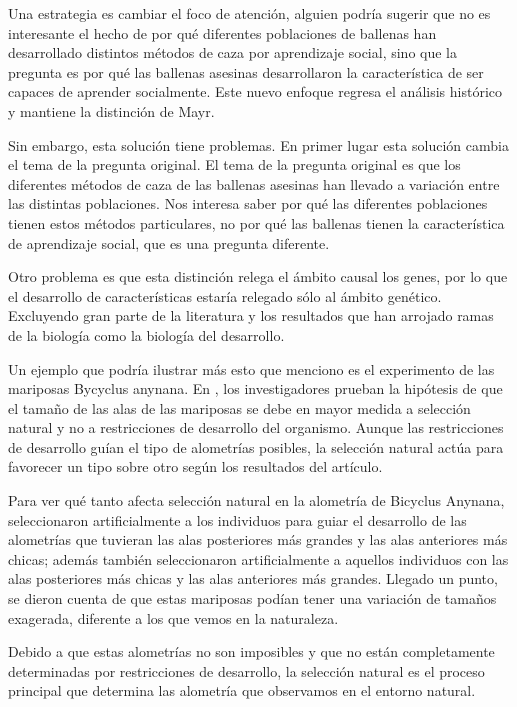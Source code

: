 Una estrategia es cambiar el foco de atención, alguien podría sugerir que no es interesante el hecho de por qué diferentes poblaciones de ballenas han desarrollado distintos métodos de caza por aprendizaje social, sino que la pregunta es por qué las ballenas asesinas desarrollaron la característica de ser capaces de aprender socialmente. Este nuevo enfoque regresa el análisis histórico y mantiene la distinción de Mayr.

Sin embargo, esta solución tiene problemas. En primer lugar esta solución cambia el tema de la pregunta original. El tema de la pregunta original es que los diferentes métodos de caza de las ballenas asesinas han llevado a variación entre las distintas poblaciones. Nos interesa saber por qué las diferentes poblaciones tienen estos métodos particulares, no por qué las ballenas tienen la característica de aprendizaje social, que es una pregunta diferente.

Otro problema es que esta distinción relega el ámbito causal los genes, por lo que el desarrollo de características estaría relegado sólo al ámbito genético. Excluyendo gran parte de la literatura y los resultados que han arrojado ramas de la biología como la biología del desarrollo.

Un ejemplo que podría ilustrar más esto que menciono es el experimento de las mariposas Bycyclus anynana. En \cite{Frankino2007}, los investigadores prueban la hipótesis de que el tamaño de las alas de las mariposas se debe en mayor medida a selección natural y no a restricciones de desarrollo del organismo. Aunque las restricciones de desarrollo guían el tipo de alometrías posibles, la selección natural actúa para favorecer un tipo sobre otro según los resultados del artículo.

Para ver qué tanto afecta selección natural en la alometría de Bicyclus Anynana, seleccionaron artificialmente a los individuos para guiar el desarrollo de las alometrías que tuvieran las alas posteriores más grandes y las alas anteriores más chicas; además también seleccionaron artificialmente a aquellos individuos con las alas posteriores más chicas y las alas anteriores más grandes. Llegado un punto, se dieron cuenta de que estas mariposas podían tener una variación de tamaños exagerada, diferente a los que vemos en la naturaleza.

Debido a que estas alometrías no son imposibles y que no están completamente determinadas por restricciones de desarrollo, la selección natural es el proceso principal que determina las alometría que observamos en el entorno natural.

